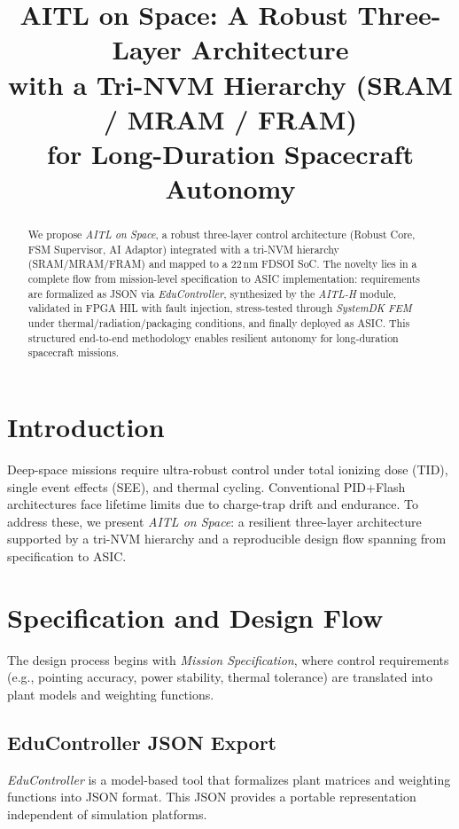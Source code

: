 \documentclass[conference]{IEEEtran}
\title{AITL on Space: A Robust Three-Layer Architecture\\
with a Tri-NVM Hierarchy (SRAM / MRAM / FRAM)\\
for Long-Duration Spacecraft Autonomy}
\author{
\IEEEauthorblockN{Shinichi Samizo}
\IEEEauthorblockA{Independent Semiconductor Researcher\\
Former Engineer at Seiko Epson Corporation\\
Email: shin3t72@gmail.com\quad GitHub: \url{https://github.com/Samizo-AITL}}
}
\begin{document}
\maketitle

\begin{abstract}
We propose \emph{AITL on Space}, a robust three-layer control architecture (Robust Core, FSM Supervisor, AI Adaptor) integrated with a tri-NVM hierarchy (SRAM/MRAM/FRAM) and mapped to a 22\,nm FD\!SOI SoC. The novelty lies in a complete flow from mission-level specification to ASIC implementation: requirements are formalized as JSON via \emph{EduController}, synthesized by the \emph{AITL-H} module, validated in FPGA HIL with fault injection, stress-tested through \emph{SystemDK FEM} under thermal/radiation/packaging conditions, and finally deployed as ASIC. This structured end-to-end methodology enables resilient autonomy for long-duration spacecraft missions.
\end{abstract}

\section{Introduction}
Deep-space missions require ultra-robust control under total ionizing dose (TID), single event effects (SEE), and thermal cycling. Conventional PID+Flash architectures face lifetime limits due to charge-trap drift and endurance. To address these, we present \emph{AITL on Space}: a resilient three-layer architecture supported by a tri-NVM hierarchy and a reproducible design flow spanning from specification to ASIC.

\section{Specification and Design Flow}
The design process begins with \emph{Mission Specification}, where control requirements (e.g., pointing accuracy, power stability, thermal tolerance) are translated into plant models and weighting functions.

\subsection{EduController JSON Export}
\emph{EduController} is a model-based tool that formalizes plant matrices and weighting functions into JSON format. This JSON provides a portable representation independent of simulation platforms.
\end{document}
